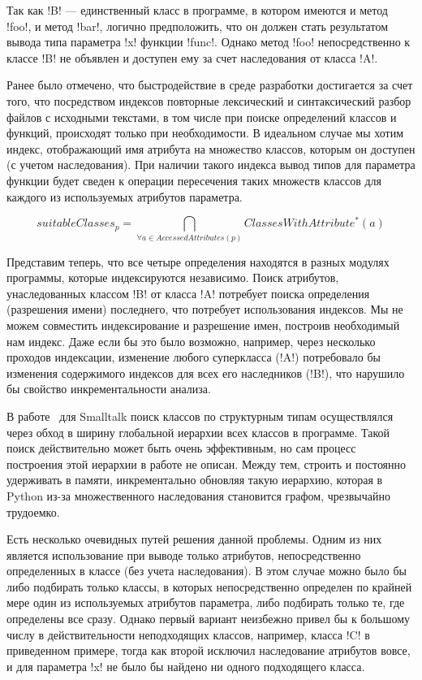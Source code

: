 Так как !B! --- единственный класс в программе, в котором имеются и метод
!foo!, и метод !bar!, логично предположить, что он должен стать
результатом вывода типа параметра !x!  функции !func!. Однако метод !foo!
непосредственно к классе !B!  не объявлен и доступен ему за счет
наследования от класса !A!. 

Ранее было отмечено, что быстродействие в среде
разработки достигается за счет того, что посредством индексов повторные
лексический и синтаксический разбор файлов с исходными текстами, в том числе при
поиске определений классов и функций, происходят только при необходимости. 
В идеальном случае мы хотим индекс, отображающий имя атрибута на множество
классов, которым он доступен (с учетом наследования). При наличии такого индекса
вывод типов для параметра функции будет сведен к операции пересечения таких множеств
классов для каждого из используемых атрибутов параметра.

\[
  suitableClasses_p = \bigcap_{\forall{a} \in AccessedAttributes(p)}
  ClassesWithAttribute^*(a)
\]

Представим теперь, что все четыре определения находятся в разных модулях
программы, которые индексируются независимо. Поиск атрибутов, унаследованных
классом !B! от класса !A! потребует поиска определения (разрешения имени) последнего, 
что потребует использования индексов. Мы не можем совместить
индексирование и разрешение имен, построив необходимый нам индекс. Даже если бы
это было возможно, например, через несколько проходов
индексации, изменение любого суперкласса (!A!) потребовало бы изменения
содержимого индексов для всех его наследников (!B!), что
нарушило бы свойство инкрементальности анализа.

В работе~\cite{Pluquet2009} для Smalltalk поиск классов по структурным типам осуществлялся
через обход в ширину глобальной иерархии всех классов в программе. Такой поиск
действительно может быть очень эффективным, но сам процесс построения этой
иерархии в работе не описан. Между тем, строить и постоянно удерживать в памяти,
инкрементально обновляя такую иерархию, которая в Python из-за множественного
наследования становится графом, чрезвычайно трудоемко.

Есть несколько очевидных путей решения данной проблемы. Одним из них является
использование при выводе только атрибутов, непосредственно определенных в классе
(без учета наследования). В этом случае можно было бы либо подбирать только
классы, в которых непосредственно определен по крайней мере один из используемых
атрибутов параметра, либо подбирать только те, где определены все сразу. Однако
первый вариант неизбежно привел бы к большому числу в действительности
неподходящих классов, например, класса !C! в приведенном примере, тогда как второй
исключил наследование атрибутов вовсе, и для параметра !x! не было бы
найдено ни одного подходящего класса.

